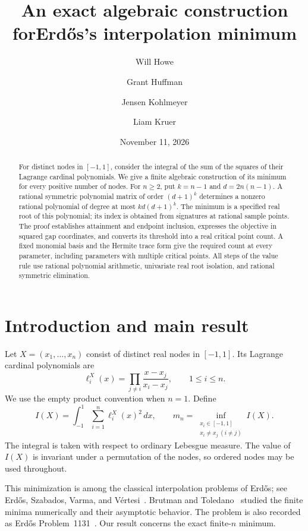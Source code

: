 \documentclass[11pt,leqno]{amsart}
\title[The minimum squared Lagrange interpolation integral]{An exact algebraic construction for\newline Erd\H{o}s's interpolation minimum}
\author[W. Howe]{Will Howe}
\author[G. Huffman]{Grant Huffman}
\author[J. Kohlmeyer]{Jensen Kohlmeyer}
\author[L. Kruer]{Liam Kruer}
\date{November 11, 2026}
\theoremstyle{definition}
\theoremstyle{remark}
\numberwithin{equation}{section}
\begin{document}
\begin{abstract}
For distinct nodes in $[-1,1]$, consider the integral of the sum of the
squares of their Lagrange cardinal polynomials. We give a finite algebraic
construction of its minimum for every positive number of nodes. For
$n\geq2$, put $k=n-1$ and $d=2n(n-1)$. A rational symmetric polynomial
matrix of order $(d+1)^k$ determines a nonzero rational polynomial of degree
at most $kd(d+1)^k$. The minimum is a specified real root of this polynomial;
its index is obtained from signatures at rational sample points. The proof
establishes attainment and endpoint inclusion, expresses the objective in
squared gap coordinates, and converts its threshold into a real critical
point count. A fixed monomial basis and the Hermite trace form give the
required count at every parameter, including parameters with multiple
critical points. All steps of the value rule use rational polynomial
arithmetic, univariate real root isolation, and rational symmetric elimination.
\end{abstract}
\maketitle

\section{Introduction and main result}

Let $X=(x_1,\ldots,x_n)$ consist of distinct real nodes in $[-1,1]$.
Its Lagrange cardinal polynomials are
\begin{equation}\label{eq:cardinals}
 \ell_i^X(x)=\prod_{j\ne i}\frac{x-x_j}{x_i-x_j},
 \qquad 1\leq i\leq n.
\end{equation}
We use the empty product convention when $n=1$. Define
\begin{equation}\label{eq:objective}
 I(X)=\int_{-1}^{1}\sum_{i=1}^n\ell_i^X(x)^2\,dx,
 \qquad
 m_n=\inf_{\substack{x_i\in[-1,1]\\x_i\ne x_j\ (i\ne j)}}I(X).
\end{equation}
The integral is taken with respect to ordinary Lebesgue measure.
The value of $I(X)$ is invariant under a permutation of the nodes, so
ordered nodes may be used throughout.

This minimization is among the classical interpolation problems of
Erd\H{o}s; see Erd\H{o}s, Szabados, Varma, and V\'ertesi~\cite{ESVV}.
Brutman and Toledano~\cite{BT} studied the finite minima numerically and
their asymptotic behavior. The problem is also recorded as Erd\H{o}s
Problem~1131~\cite{Bloom}. Our result concerns the exact finite-$n$ minimum.
\end{document}
